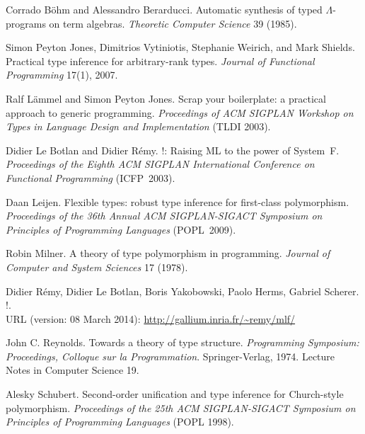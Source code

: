 \begin{thebibliography}{99}

Corrado B\"ohm and Alessandro Berarducci.
Automatic synthesis of typed $\Lambda$-programs on term algebras.
\emph{Theoretic Computer Science} 39 (1985).

Simon Peyton Jones, Dimitrios Vytiniotis, Stephanie Weirich, and
Mark Shields.
Practical type inference for arbitrary-rank types.
\emph{Journal of Functional Programming} 17(1), 2007.

Ralf L\"ammel and Simon Peyton Jones.
Scrap your boilerplate: a practical approach to generic
programming.
\emph{Proceedings of ACM SIGPLAN Workshop on Types in Language
Design and Implementation} (TLDI 2003).

Didier Le Botlan and Didier R\'emy.
\MLF!: Raising ML to the power of System~F.
\emph{Proceedings of the Eighth ACM SIGPLAN International
Conference on Functional Programming} (ICFP~2003).

Daan Leijen.
Flexible types: robust type inference for first-class
polymorphism.
\emph{Proceedings of the 36th Annual ACM SIGPLAN-SIGACT Symposium
on Principles of Programming Languages} (POPL~2009).

Robin Milner.
A theory of type polymorphism in programming.
\emph{Journal of Computer and System Sciences} 17 (1978).

Didier R\'emy, Didier Le Botlan, Boris Yakobowski, Paolo Herms,
Gabriel Scherer.
\MLF!.\\
URL (version: 08 March 2014):
\hbox{\url{http://gallium.inria.fr/~remy/mlf/}}

John C. Reynolds.
Towards a theory of type structure.
\emph{Programming Symposium: Proceedings, Colloque sur
la Programmation}. Springer-Verlag, 1974. Lecture Notes in
Computer Science 19.

Alesky Schubert.
Second-order unification and type inference for Church-style
polymorphism.
\emph{Proceedings of the 25th ACM SIGPLAN-SIGACT Symposium on
Principles of Programming Languages} (POPL 1998).


\end{thebibliography}
